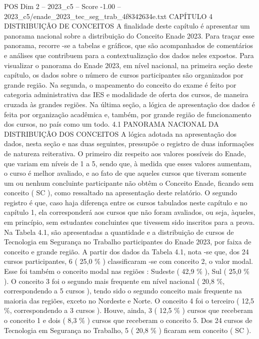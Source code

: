 \begin{textsample}{POS Dim 2 – 2023\_c5 – Score -1.00 – 2023\_c5/enade\_2023\_tec\_seg\_trab\_4f8342634e.txt}  \label{ex:f2_pos_256}
CAPÍTULO 4 DISTRIBUIÇÃO DE CONCEITOS A finalidade deste capítulo é apresentar um panorama nacional sobre a distribuição do Conceito Enade 2023.
Para traçar esse panorama, recorre -se a tabelas e gráficos, que são acompanhados de comentários e análises que contribuem para a contextualização dos dados neles expostos.
Para visualizar o panorama do Enade 2023, em nível nacional, na primeira seção deste capítulo, os dados sobre o número de cursos participantes são organizados por grande região.
Na segunda, o mapeamento do conceito do exame é feito por categoria administrativa das IES e modalidade de oferta dos cursos, de maneira cruzada às grandes regiões.
Na última seção, a lógica de apresentação dos dados é feita por organização acadêmica e, também, por grande região de funcionamento dos cursos, no país como um todo. 4.1 PANORAMA NACIONAL DA DISTRIBUIÇÃO DOS CONCEITOS A lógica adotada na apresentação dos dados, nesta seção e nas duas seguintes, pressupõe o registro de duas informações de natureza reiterativa.
O primeiro diz respeito aos valores possíveis do Enade, que variam em níveis de 1 a 5, sendo que, à medida que esses valores aumentam, o curso é melhor avaliado, e ao fato de que aqueles cursos que tiveram somente um ou nenhum concluinte participante não obtêm o Conceito Enade, ficando sem conceito ( SC ), como ressaltado na apresentação deste relatório.
O segundo registro é que, caso haja diferença entre os cursos tabulados neste capítulo e no capítulo 1, ela corresponderá aos cursos que não foram avaliados, ou seja, àqueles, em princípio, sem estudantes concluintes que tivessem sido inscritos para a prova.
Na Tabela 4.1, são apresentadas a quantidade e a distribuição de cursos de Tecnologia em Segurança no Trabalho participantes do Enade 2023, por faixa de conceito e grande região.
A partir dos dados da Tabela 4.1, nota -se que, dos 24 cursos participantes, 6 ( 25,0 \% ) classificaram -se com conceito 2, o valor modal.
Esse foi também o conceito modal nas regiões : Sudeste ( 42,9 \% ), Sul ( 25,0 \% ).
O conceito 3 foi o segundo mais frequente em nível nacional ( 20,8 \%, correspondendo a 5 cursos ), tendo sido o segundo conceito mais frequente na maioria das regiões, exceto no Nordeste e Norte.
O conceito 4 foi o terceiro ( 12,5 \%, correspondendo a 3 cursos ).
Houve, ainda, 3 ( 12,5 \% ) cursos que receberam o conceito 1 e dois ( 8,3 \% ) cursos que receberam o conceito 5.
Dos 24 cursos de Tecnologia em Segurança no Trabalho, 5 ( 20,8 \% ) ficaram sem conceito ( SC ).

\end{textsample}
